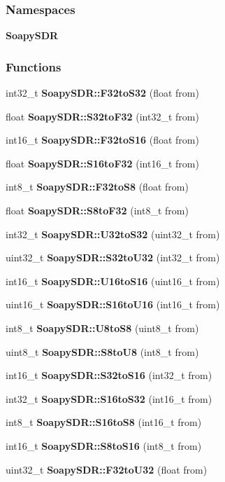 \subsubsection*{Namespaces}
\begin{DoxyCompactItemize}
\item 
 {\bf Soapy\+S\+DR}
\end{DoxyCompactItemize}
\subsubsection*{Functions}
\begin{DoxyCompactItemize}
\item 
int32\+\_\+t {\bf Soapy\+S\+D\+R\+::\+F32to\+S32} (float from)
\item 
float {\bf Soapy\+S\+D\+R\+::\+S32to\+F32} (int32\+\_\+t from)
\item 
int16\+\_\+t {\bf Soapy\+S\+D\+R\+::\+F32to\+S16} (float from)
\item 
float {\bf Soapy\+S\+D\+R\+::\+S16to\+F32} (int16\+\_\+t from)
\item 
int8\+\_\+t {\bf Soapy\+S\+D\+R\+::\+F32to\+S8} (float from)
\item 
float {\bf Soapy\+S\+D\+R\+::\+S8to\+F32} (int8\+\_\+t from)
\item 
int32\+\_\+t {\bf Soapy\+S\+D\+R\+::\+U32to\+S32} (uint32\+\_\+t from)
\item 
uint32\+\_\+t {\bf Soapy\+S\+D\+R\+::\+S32to\+U32} (int32\+\_\+t from)
\item 
int16\+\_\+t {\bf Soapy\+S\+D\+R\+::\+U16to\+S16} (uint16\+\_\+t from)
\item 
uint16\+\_\+t {\bf Soapy\+S\+D\+R\+::\+S16to\+U16} (int16\+\_\+t from)
\item 
int8\+\_\+t {\bf Soapy\+S\+D\+R\+::\+U8to\+S8} (uint8\+\_\+t from)
\item 
uint8\+\_\+t {\bf Soapy\+S\+D\+R\+::\+S8to\+U8} (int8\+\_\+t from)
\item 
int16\+\_\+t {\bf Soapy\+S\+D\+R\+::\+S32to\+S16} (int32\+\_\+t from)
\item 
int32\+\_\+t {\bf Soapy\+S\+D\+R\+::\+S16to\+S32} (int16\+\_\+t from)
\item 
int8\+\_\+t {\bf Soapy\+S\+D\+R\+::\+S16to\+S8} (int16\+\_\+t from)
\item 
int16\+\_\+t {\bf Soapy\+S\+D\+R\+::\+S8to\+S16} (int8\+\_\+t from)
\item 
uint32\+\_\+t {\bf Soapy\+S\+D\+R\+::\+F32to\+U32} (float from)
\item 

\end{DoxyCompactItemize}
